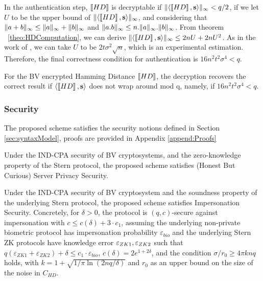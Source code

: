 In the authentication step, \(\left\llbracket HD\right\rrbracket\) is decryptable if \(\Vert \langle \left\llbracket HD\right\rrbracket, \mathbf{s} \rangle \Vert_{\infty} < q/2\), if
we let \(U\) to be the upper bound of \(\Vert \langle \left\llbracket HD\right\rrbracket, \mathbf{s} \rangle \Vert_{\infty}\), and considering that
\(\Vert a + b \Vert_{\infty} \leq \Vert a \Vert_{\infty} + \Vert b \Vert_{\infty}\) and \(\Vert a.b \Vert_{\infty} \leq n.\Vert a \Vert_{\infty}.\Vert b \Vert_{\infty}\). From theorem
~\ref{theo:HDComputation}, we can derive \(\Vert \langle \left\llbracket HD\right\rrbracket,\mathbf{s} \rangle \Vert_{\infty} \leq 2nU + 2nU^{2}\). As in the
work of \cite{naehrig2011can}, we can take \(U\) to be \(2t \sigma^{2} \sqrt{n}\), which is an experimental
estimation. Therefore, the final correctness condition for authentication is \( 16n^{2}t^{2}\sigma^{4} < q\).
\begin{lemma}
  \label{le:hdcorrectness}
 For the BV encrypted Hamming Distance \(\left\llbracket HD\right\rrbracket\), the decryption recovers the correct result if \(\langle \left\llbracket HD\right\rrbracket,
 \mathbf{s} \rangle\) does not wrap around mod q, namely, if \(16n^{2}t^{2}\sigma^{4} < q\).
\end{lemma}

\subsubsection{Security}
\label{sec:security}
The proposed scheme satisfies the security notions defined in Section \ref{sec:syntaxModel}, proofs are
provided in Appendix \ref{append:Proofs}
\begin{theorem}
  \label{theo:server}
  Under the IND-CPA security of BV cryptosystems, and the zero-knowledge property of the Stern protocol, the proposed
  scheme satisfies (Honest But Curious) Server Privacy Security.
\end{theorem}
\begin{theorem}
  \label{theo:client}
  Under the IND-CPA security of BV cryptosystem and the soundness property of the underlying Stern protocol, the
  proposed scheme satisfies Impersonation Security. Concretely, for $\delta>0$, the protocol is $(q,c)$-secure against
  impersonation with $c \leq c(\delta) + 3 \cdot c_1$, assuming the underlying non-private biometric protocol has
  impersonation probability $\varepsilon_{bio}$ and the underlying Stern ZK protocols have knowledge error
  $\varepsilon_{ZK1},\varepsilon_{ZK2}$ such that
  $q(\varepsilon_{ZK1}+\varepsilon_{ZK2}) + \delta \leq c_1 \cdot
  \varepsilon_{bio}$, $c(\delta) = 2 e^{1+2\delta}$, and the condition $\sigma/r_0 \geq 4 \pi k n q$ holds, with
  $k = 1 + \sqrt{1/\pi \ln(2nq/\delta)}$ and $r_0$ as an upper bound on the size of the noise in $C_{HD}$.
\end{theorem}

